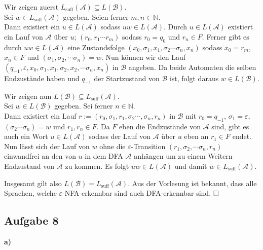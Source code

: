 \documentclass[a4paper,graphics,11pt]{article}
\newcommand{\aufgabe}[1]{\subsection*{Aufgabe #1}}
\begin{document}
Wir zeigen zuerst $L_{\text{suff}}(\mathcal{A}) \subseteq L(\mathcal{B})$.\\[2pt]
Sei $w \in L_{\text{suff}}(\mathcal{A})$ gegeben. Seien ferner $m,n \in \mathbb{N}$.\\
Dann existiert ein $u \in L(\mathcal{A})$ sodass $uw \in L(\mathcal{A})$.
Durch $u \in L(\mathcal{A})$ existiert ein Lauf von $\mathcal{A}$ über $u$;
$(r_0, r_1 \cdots r_m)$ sodass $r_0 = q_0$ und $r_n \in F$.
Ferner gibt es durch $uw \in L(\mathcal{A})$ eine Zustandsfolge
$(x_0, \sigma_1, x_1, \sigma_2 \cdots \sigma_n, x_n)$ sodass $x_0 = r_m$, $x_n \in F$ und
$(\sigma_1, \sigma_2, \cdots \sigma_n) = w$. Nun können wir den Lauf $(q_{-1}, \varepsilon, x_0, \sigma_1, x_1, \sigma_2, x_2, \cdots \sigma_n, x_n)$ in $\mathcal{B}$ angeben. Da beide
Automaten die selben Endzustände haben und $q_{-1}$ der Startzustand von $\mathcal{B}$ ist, folgt daraus $w \in L(\mathcal{B})$.
\newpage

Wir zeigen nun $L(\mathcal{B}) \subseteq L_{\text{suff}}(\mathcal{A})$.\\[2pt]
Sei $w \in L(\mathcal{B})$ gegeben. Sei ferner $n \in \mathbb{N}$.\\
Dann existiert ein Lauf $r := (r_0, \sigma_1, r_1, \sigma_2 \cdots, \sigma_n, r_n)$
in $\mathcal{B}$ mit $r_0 = q_{-1}$, $\sigma_1 = \varepsilon$, $(\sigma_2 \cdots \sigma_n) = w$ und $r_1, r_n \in F$.
Da $F$ eben die Endzustände von $\mathcal{A}$ sind, gibt es auch ein Wort $u \in L(\mathcal{A})$ sodass der Lauf von $\mathcal{A}$ über $u$ eben an $r_1 \in F$ endet. Nun lässt sich der Lauf
von $w$ ohne die $\varepsilon$-Transition $(r_1, \sigma_2, \cdots \sigma_n, r_n)$ einwandfrei
an den von $u$ in dem DFA $\mathcal{A}$ anhängen um zu einem Weitern Endzustand von $\mathcal{A}$ zu kommen. Es folgt $uw \in L(\mathcal{A})$ und damit $w \in L_{\text{suff}}(\mathcal{A})$.

Insgesamt gilt also $L(\mathcal{B}) = L_{\text{suff}}(\mathcal{A})$. Aus der Vorlesung ist
bekannt, dass alle Sprachen, welche $\varepsilon$-NFA-erkennbar sind auch DFA-erkennbar sind.
$\hfill\square$

\aufgabe{8}
\textbf{a)}\\

\end{document}

